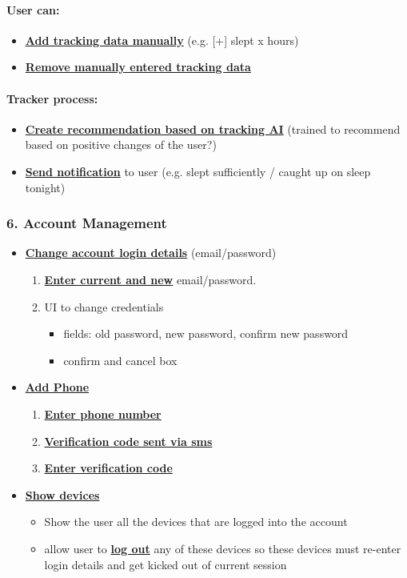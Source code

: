 \documentclass[a4paper,11pt]{article} %
\begin{document}
\paragraph{User can:}
\begin{itemize}
  \item \textbf{\ul{Add tracking data manually}} (e.g. [+] slept x hours)
  \item \textbf{\ul{Remove manually entered tracking data}}
\end{itemize}

\paragraph{Tracker process:}
\begin{itemize}
  \item \textbf{\ul{Create recommendation based on tracking AI}} (trained to recommend based on positive changes of the user?)
  \item \textbf{\ul{Send notification}} to user (e.g. slept sufficiently / caught up on sleep tonight)
\end{itemize}


\subsubsection*{6. Account Management}
\begin{itemize}
  \item \textbf{\ul{Change account login details}} (email/password)
  \begin{enumerate}
    \item \textbf{\ul{Enter current and new}} email/password.
    \item UI to change credentials
    \begin{itemize}
      \item fields: old password, new password, confirm new password
      \item confirm and cancel box
    \end{itemize}
  \end{enumerate}
  \item \textbf{\ul{Add Phone}}
  \begin{enumerate}
    \item \textbf{\ul{Enter phone number}}
    \item \textbf{\ul{Verification code sent via sms}}
    \item \textbf{\ul{Enter verification code}}
  \end{enumerate} 
  \item \textbf{\ul{Show devices}}
  \begin{itemize}
    \item Show the user all the devices that are logged into the account
    \item allow user to \textbf{\ul{log out}} any of these devices so these devices must re-enter login details and get kicked out of current session
  \end{itemize} 
\end{itemize}
\end{document}
